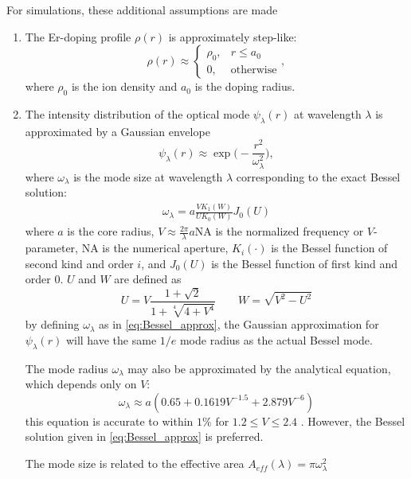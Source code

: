 \documentclass[a4paper]{article}
\begin{document}
For simulations, these additional assumptions are made
\begin{enumerate}
	\item The Er-doping profile $\rho(r)$ is approximately step-like:
	\begin{equation}
		\rho(r) \approx \begin{cases}
		\rho_0,  & r \leq a_0\\
		0, & \text{otherwise}
		\end{cases},
	\end{equation}
	where $\rho_0$ is the ion density and $a_0$ is the doping radius.
	\item The intensity distribution of the optical mode $\psi_\lambda(r)$ at wavelength $\lambda$ is approximated by a Gaussian envelope \cite[eq. (1.80)]{principles}
	\begin{equation}
		\psi_\lambda(r) \approx \exp\Big(-\frac{r^2}{\omega_\lambda^2}\Big), 
	\end{equation}
	where $\omega_\lambda$ is the mode size at wavelength $\lambda$ corresponding to the exact Bessel solution:
	\begin{align} \label{eq:Bessel_approx}
		\omega_\lambda = a\frac{VK_1(W)}{UK_0(W)}J_0(U)
	\end{align}
	where $a$ is the core radius, $V \approx \frac{2\pi}{\lambda}a\mathrm{NA}$ is the normalized frequency or $V$-parameter, NA is the numerical aperture, $K_i(\cdot)$ is the Bessel function of second kind and order $i$, and $J_0(U)$ is the Bessel function of first kind and order $0$. $U$ and $W$ are defined as
	\begin{equation}
		U = V\frac{1 + \sqrt{2}}{1 + \sqrt[4]{4 + V^4}} \qquad W = \sqrt{V^2 - U^2}
	\end{equation}
	by defining $\omega_\lambda$ as in \eqref{eq:Bessel_approx}, the Gaussian approximation for $\psi_\lambda(r)$ will have the same $1/e$ mode radius as the actual Bessel mode.
	
	The mode radius $\omega_\lambda$ may also be approximated by the analytical equation, which depends only on $V$:
	\begin{equation}
		\omega_\lambda \approx a(0.65 + 0.1619V^{-1.5} + 2.879V^{-6})
	\end{equation}
	this equation is accurate to within $1\%$ for $1.2\leq V\leq 2.4$ \cite[eq. (2.2.43)]{Agrawal}. However, the Bessel solution given in \eqref{eq:Bessel_approx} is preferred.
	
	The mode size is related to the effective area $A_{eff}(\lambda) = \pi\omega^2_\lambda$
	

\end{enumerate}
\end{document}
